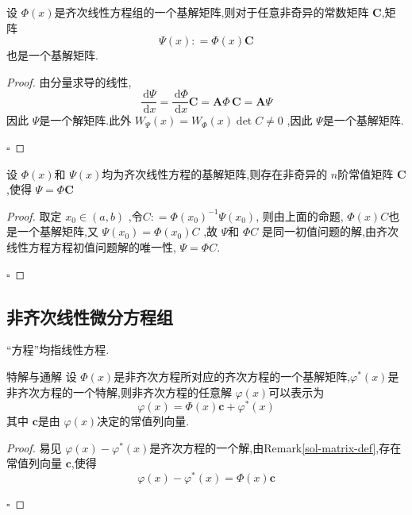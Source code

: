\documentclass[lang=cn,12pt,color=green,fontset=none]{elegantbook}
\begin{document}
\begin{proposition}
    设 $ \Phi \left( x \right)  $是齐次线性方程组的一个基解矩阵,则对于任意非奇异的常数矩阵 $ \mathbf{C} $,矩阵 $$
    \Psi \left( x \right): = \Phi \left( x \right) \mathbf{C}  
    $$ 也是一个基解矩阵.
\end{proposition}

\begin{proof}
    由分量求导的线性, $$
    \frac{\,\mathrm{d} \Psi  }{\,\mathrm{d} x } = \frac{\,\mathrm{d} \Phi  }{\,\mathrm{d} x } \mathbf{C}= \mathbf{A}\Phi\, \mathbf{C}= \mathbf{A}\Psi   
    $$因此 $ \Psi  $是一个解矩阵.此外 $ W_{\Psi }\left( x \right)= W_{\Phi }\left( x \right) \det C \neq  0   $ ,因此 $ \Psi  $是一个基解矩阵. 

    \hfill $\square$
\end{proof}

\begin{proposition}\label{homo-EE-trans}
    设 $ \Phi \left( x \right)  $和 $ \Psi \left( x \right)  $均为齐次线性方程的基解矩阵,则存在非奇异的 $ n $阶常值矩阵 $ \mathbf{C} $,使得 $ \Psi = \Phi \mathbf{C} $     
\end{proposition}
\begin{proof}
   取定 $ x_0 \in \left( a,b \right)  $  ,令$ C: = \Phi \left( x_0 \right)^{-1} \Psi \left( x_0 \right)   $, 则由上面的命题, $ \Phi \left( x \right)C  $也是一个基解矩阵,又 $ \Psi \left( x_0 \right)= \Phi \left( x_0 \right)C   $ ,故 $ \Psi  $和 $ \Phi C $  是同一初值问题的解,由齐次线性方程方程初值问题解的唯一性, $ \Psi =\Phi C $. 

    \hfill $\square$
\end{proof}
\subsection{非齐次线性微分方程组}

\begin{introduction}[约定]
    \item “方程”均指线性方程.
\end{introduction}

\begin{lemma}{特解与通解}\label{rel-sp-gen-so}
    设 $ \Phi \left( x \right)  $是非齐次方程所对应的齐次方程的一个基解矩阵,$ \varphi ^{*}\left( x \right)  $是非齐次方程的一个特解,则非齐次方程的任意解 $ \varphi \left( x \right)  $可以表示为 $$
    \varphi \left( x \right)=\Phi \left( x \right)\mathbf{c}+ \varphi ^{*}\left( x \right)   
    $$   其中 $ \mathbf{c} $是由 $ \varphi \left( x \right)  $决定的常值列向量.  
\end{lemma}
\begin{proof}
    易见 $ \varphi \left( x \right)-\varphi ^{*}\left( x \right)   $是齐次方程的一个解,由Remark\ref{sol-matrix-def},存在常值列向量 $ \mathbf{c} $,使得 $$
    \varphi \left( x \right)-\varphi ^{*}\left( x \right)=\Phi \left( x \right) \mathbf{c}  
    $$ 

    \hfill $\square$
\end{proof}
\end{document}
